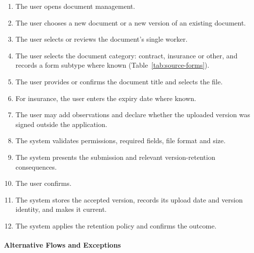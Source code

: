 \begin{enumerate}
    \item The user opens document management.
    \item The user chooses a new document
    or a new version of an existing document.
    \item The user selects or reviews the document's single worker.
    \item The user selects the document category:
    contract, insurance or other, and records a form subtype where known
    (Table~\ref{tab:source-forms}).
    \item The user provides or confirms
    the document title and selects the file.
    \item For insurance, the user enters
    the expiry date where known.
    \item The user may add observations
    and declare whether the uploaded version
    was signed outside the application.
    \item The system validates permissions,
    required fields, file format and size.
    \item The system presents the submission
    and relevant version-retention consequences.
    \item The user confirms.
    \item The system stores the accepted version,
    records its upload date and version identity,
    and makes it current.
    \item The system applies the retention policy
    and confirms the outcome.
\end{enumerate}

\paragraph{Alternative Flows and Exceptions}

